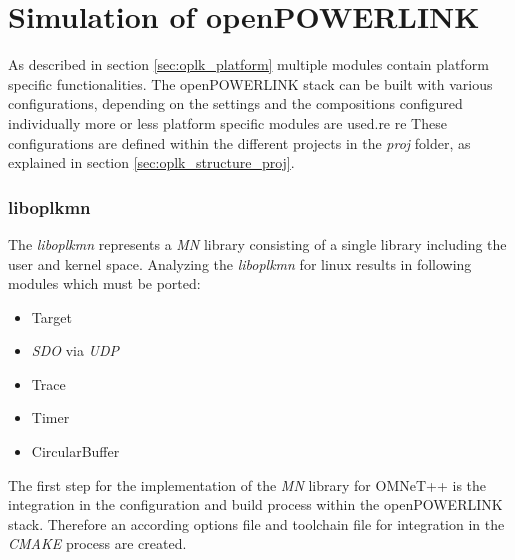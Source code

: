 \chapter{Simulation of openPOWERLINK}
\label{cha:porting}

As described in section \ref{sec:oplk_platform} multiple modules contain platform specific functionalities.
The openPOWERLINK stack can be built with various configurations, depending on the settings and the compositions configured individually more or less platform specific modules are used.re re
These configurations are defined within the different projects in the \emph{proj} folder, as explained in section \ref{sec:oplk_structure_proj}.

\subsection{liboplkmn}
\label{cha:porting_liboplkmn}

The \emph{liboplkmn} represents a \emph{MN} library consisting of a single library including the user and kernel space.
Analyzing the \emph{liboplkmn} for linux results in following modules which must be ported:

\begin{itemize}
    \item Target
    \item \emph{SDO} via \emph{UDP}
    \item Trace
    \item Timer
    \item CircularBuffer
\end{itemize}

The first step for the implementation of the \emph{MN} library for OMNeT++ is the integration in the configuration and build process within the openPOWERLINK stack.
Therefore an according options file and toolchain file for integration in the \emph{CMAKE} process are created.